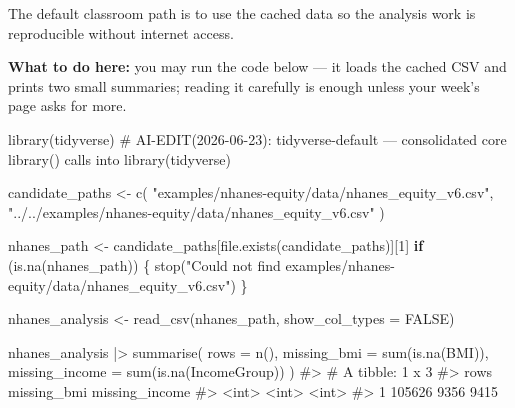 \documentclass[
  letterpaper,
  DIV=11,
  numbers=noendperiod,
  oneside]{scrreprt}
\newenvironment{Shaded}{\begin{snugshade}}{\end{snugshade}}
\newcommand{\AttributeTok}[1]{\textcolor[rgb]{0.40,0.45,0.13}{#1}}
\newcommand{\CommentTok}[1]{\textcolor[rgb]{0.37,0.37,0.37}{#1}}
\newcommand{\ConstantTok}[1]{\textcolor[rgb]{0.56,0.35,0.01}{#1}}
\newcommand{\ControlFlowTok}[1]{\textcolor[rgb]{0.00,0.23,0.31}{\textbf{#1}}}
\newcommand{\DecValTok}[1]{\textcolor[rgb]{0.68,0.00,0.00}{#1}}
\newcommand{\FunctionTok}[1]{\textcolor[rgb]{0.28,0.35,0.67}{#1}}
\newcommand{\NormalTok}[1]{\textcolor[rgb]{0.00,0.23,0.31}{#1}}
\newcommand{\OtherTok}[1]{\textcolor[rgb]{0.00,0.23,0.31}{#1}}
\newcommand{\SpecialCharTok}[1]{\textcolor[rgb]{0.37,0.37,0.37}{#1}}
\newcommand{\StringTok}[1]{\textcolor[rgb]{0.13,0.47,0.30}{#1}}
\begin{document}
The default classroom path is to use the cached data so the analysis
work is reproducible without internet access.

\textbf{What to do here:} you may run the code below --- it loads the
cached CSV and prints two small summaries; reading it carefully is
enough unless your week's page asks for more.

\begin{Shaded}
\begin{Highlighting}[numbers=left,,]
\FunctionTok{library}\NormalTok{(tidyverse) }\CommentTok{\# AI{-}EDIT(2026{-}06{-}23): tidyverse{-}default — consolidated core library() calls into library(tidyverse)}

\NormalTok{candidate\_paths }\OtherTok{\textless{}{-}} \FunctionTok{c}\NormalTok{(}
  \StringTok{"examples/nhanes{-}equity/data/nhanes\_equity\_v6.csv"}\NormalTok{,}
  \StringTok{"../../examples/nhanes{-}equity/data/nhanes\_equity\_v6.csv"}
\NormalTok{)}

\NormalTok{nhanes\_path }\OtherTok{\textless{}{-}}\NormalTok{ candidate\_paths[}\FunctionTok{file.exists}\NormalTok{(candidate\_paths)][}\DecValTok{1}\NormalTok{]}
\ControlFlowTok{if}\NormalTok{ (}\FunctionTok{is.na}\NormalTok{(nhanes\_path)) \{}
  \FunctionTok{stop}\NormalTok{(}\StringTok{"Could not find examples/nhanes{-}equity/data/nhanes\_equity\_v6.csv"}\NormalTok{)}
\NormalTok{\}}

\NormalTok{nhanes\_analysis }\OtherTok{\textless{}{-}} \FunctionTok{read\_csv}\NormalTok{(nhanes\_path, }\AttributeTok{show\_col\_types =} \ConstantTok{FALSE}\NormalTok{)}

\NormalTok{nhanes\_analysis }\SpecialCharTok{|\textgreater{}}
  \FunctionTok{summarise}\NormalTok{(}
    \AttributeTok{rows =} \FunctionTok{n}\NormalTok{(),}
    \AttributeTok{missing\_bmi =} \FunctionTok{sum}\NormalTok{(}\FunctionTok{is.na}\NormalTok{(BMI)),}
    \AttributeTok{missing\_income =} \FunctionTok{sum}\NormalTok{(}\FunctionTok{is.na}\NormalTok{(IncomeGroup))}
\NormalTok{  )}
\CommentTok{\#\textgreater{} \# A tibble: 1 x 3}
\CommentTok{\#\textgreater{}     rows missing\_bmi missing\_income}
\CommentTok{\#\textgreater{}    \textless{}int\textgreater{}       \textless{}int\textgreater{}          \textless{}int\textgreater{}}
\CommentTok{\#\textgreater{} 1 105626        9356           9415}


\end{Highlighting}
\end{Shaded}
\end{document}
